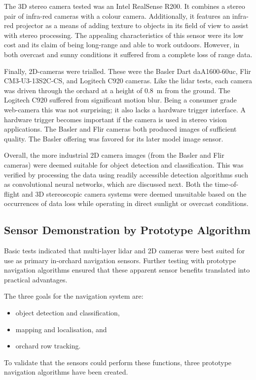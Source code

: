 \documentclass[preprint,authoryear,12pt]{elsarticle}
\begin{document}
        The 3D stereo camera tested was an Intel RealSense R200.
        It combines a stereo pair of infra-red cameras with a colour camera.
        Additionally, it features an infra-red projector as a means of adding texture to objects in its field of view to assist with stereo processing.
        The appealing characteristics of this sensor were its low cost and its claim of being long-range and able to work outdoors.
        However, in both overcast and sunny conditions it suffered from a complete loss of range data.

        Finally, 2D-cameras were trialled.
        These were the Basler Dart daA1600-60uc, Flir CM3-U3-13S2C-CS, and Logitech C920 cameras.
        Like the lidar tests, each camera was driven through the orchard at a height of \SI{0.8}{\meter} from the ground.
        The Logitech C920 suffered from significant motion blur.
        Being a consumer grade web-camera this was not surprising; it also lacks a hardware trigger interface.
        A hardware trigger becomes important if the camera is used in stereo vision applications.
        The Basler and Flir cameras both produced images of sufficient quality.
        The Basler offering was favored for its later model image sensor.

        Overall, the more industrial 2D camera images (from the Basler and Flir cameras) were deemed suitable for object detection and classification.
        This was verified by processing the data using readily accessible detection algorithms such as convolutional neural networks, which are discussed next.
        Both the time-of-flight and 3D stereoscopic camera systems were deemed unsuitable based on the occurrences of data loss while operating in direct sunlight or overcast conditions.

\subsection{Sensor Demonstration by Prototype Algorithm}

    Basic tests indicated that multi-layer lidar and 2D cameras were best suited for use as primary in-orchard navigation sensors.
    Further testing with prototype navigation algorithms ensured that these apparent sensor benefits translated into practical advantages.

    The three goals for the navigation system are:
    \begin{itemize}
        \item object detection and classification,
        \item mapping and localisation, and
        \item orchard row tracking.
    \end{itemize}
    To validate that the sensors could perform these functions, three prototype navigation algorithms have been created.
\end{document}
